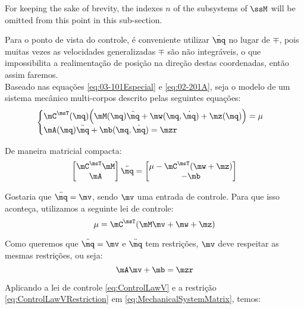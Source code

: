 For keeping the sake of brevity, the indexes $n$ of the subsystems of $\ssM$ will be omitted from this point in this sub-section.

Para o ponto de vista do controle, \'e conveniente utilizar $\dot{\mq}$ no lugar de $\mp$, pois muitas vezes as velocidades generalizadas $\mp$ s\~ao n\~ao integr\'aveis, o que impossibilita a realimenta\c{c}\~ao de posi\c{c}\~ao na dire\c{c}\~ao destas coordenadas, ent\~ao assim faremos. \\

Baseado nas equa\c{c}\~oes \eqref{eq:03-101Especial}  e \eqref{eq:02-201A}, seja o modelo de um sistema mec\^anico multi-corpos descrito pelas seguintes equa\c{c}\~oes:
\begin{equation} \label{eq:MechanicalSystem}
\begin{cases}
\mC^\msT (\mq) \Big( \mM (\mq) \ddot{\mq} + \mw (\mq, \dot{\mq}) + \mz (\mq) \Big) = \mu \\
\mA (\mq) \ddot{\mq} + \mb (\mq, \dot{\mq}) = \mzr
\end{cases}
\end{equation}

De maneira matricial compacta:
\begin{equation} \label{eq:MechanicalSystemMatrix}
\begin{bmatrix}
\mC^\msT \mM \\
\mA
\end{bmatrix}
\ddot{\mq}
=
\begin{bmatrix}
\mu - \mC^\msT(\mw + \mz) \\
-\mb
\end{bmatrix}
\end{equation}

Gostaria que $ \ddot{\mq} = \mv $, sendo $\mv$ uma entrada de controle. Para que isso aconte\c{c}a, utilizamos a seguinte lei de controle:
\begin{equation} \label{eq:ControlLawV}
\mu = \mC^\msT ( \mM \mv + \mw + \mz )
\end{equation}

Como queremos que $ \ddot{\mq} = \mv $ e $\ddot{\mq}$ tem restri\c{c}\~oes, $\mv$ deve respeitar as mesmas restri\c{c}\~oes, ou seja:
\begin{equation} \label{eq:ControlLawVRestriction}
\mA \mv + \mb = \mzr
\end{equation}

Aplicando a lei de controle \eqref{eq:ControlLawV} e a restri\c{c}\~ao \eqref{eq:ControlLawVRestriction} em \eqref{eq:MechanicalSystemMatrix}, temos: \\

